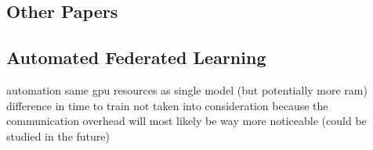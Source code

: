 \subsection{Other Papers}


\subsection{Automated Federated Learning}
automation
same gpu resources as single model (but potentially more ram)
difference in time to train not taken into consideration because the communication overhead will most likely be way more noticeable (could be studied in the future)
